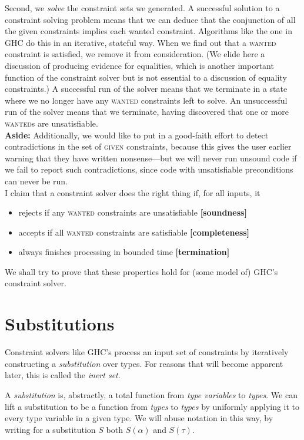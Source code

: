 \documentclass[10pt, letterpaper, oneside]{article}
\begin{document}
Second, we \emph{solve} the constraint sets we generated. A successful solution to a constraint solving problem means that we can deduce that the conjunction of all the given constraints implies each wanted constraint. Algorithms like the one in GHC do this in an iterative, stateful way. When we find out that a \textsc{wanted} constraint is satisfied, we remove it from consideration. (We elide here a discussion of producing evidence for equalities, which is another important function of the constraint solver but is not essential to a discussion of equality constraints.) A successful run of the solver means that we terminate in a state where we no longer have any \textsc{wanted} constraints left to solve. An unsuccessful run of the solver means that we terminate, having discovered that one or more {\textsc{wanted}}s are unsatisfiable.\\

\textbf{Aside:} Additionally, we would like to put in a good-faith effort to detect contradictions in the set of \textsc{given} constraints, because this gives the user earlier warning that they have written nonsense---but we will never run unsound code if we fail to report such contradictions, since code with unsatisfiable preconditions can never be run.\\

I claim that a constraint solver does the right thing if, for all inputs, it
\begin{itemize}
\item rejects if any \textsc{wanted} constraints are unsatisfiable \textbf{[soundness]}
\item accepts if all \textsc{wanted} constraints are satisfiable \textbf{[completeness]}
\item always finishes processing in bounded time \textbf{[termination]}
\end{itemize}

We shall try to prove that these properties hold for (some model of) GHC's constraint solver.

\section{Substitutions}

Constraint solvers like GHC's process an input set of constraints by iteratively constructing a \emph{substitution} over types. For reasons that will become apparent later, this is called the \emph{inert set}.

A \emph{substitution} is, abstractly, a total function from \emph{type variables} to \emph{types}. We can lift a substitution to be a function from \emph{types} to \emph{types} by uniformly applying it to every type variable in a given type. We will abuse notation in this way, by writing for a substitution \(S\) both \(S(\alpha)\) and \(S(\tau)\).
\end{document}
